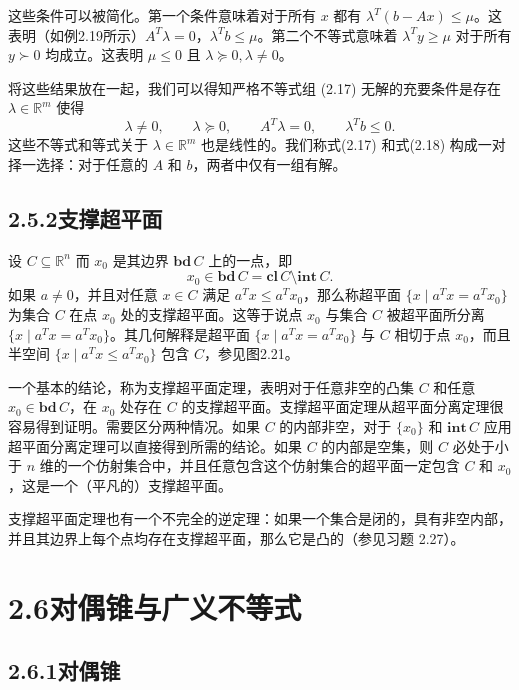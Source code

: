 \documentclass[UTF8,12pt,a4paper,fontset=fandol]{ctexart}
\begin{document}
这些条件可以被简化。第一个条件意味着对于所有 $x$ 都有 $\lambda^T(b-Ax)\le\mu$。这表明（如例2.19所示）$A^T\lambda=0$，$\lambda^Tb\le\mu$。第二个不等式意味着 $\lambda^Ty\ge\mu$ 对于所有 $y\succ0$ 均成立。这表明 $\mu\le0$ 且 $\lambda\succeq0,\lambda\ne0$。

将这些结果放在一起，我们可以得知严格不等式组 (2.17) 无解的充要条件是存在 $\lambda\in\mathbb{R}^m$ 使得
\begin{equation}
  \lambda\ne0,\qquad \lambda\succeq0,\qquad A^T\lambda=0,\qquad \lambda^Tb\le0.
  \tag{2.18}
\end{equation}
这些不等式和等式关于 $\lambda\in\mathbb{R}^m$ 也是线性的。我们称式(2.17) 和式(2.18) 构成一对择一选择：对于任意的 $A$ 和 $b$，两者中仅有一组有解。

\subsection*{2.5.2\quad 支撑超平面}

设 $C\subseteq\mathbb{R}^n$ 而 $x_0$ 是其边界 $\mathbf{bd}\,C$ 上的一点，即
\[
  x_0\in\mathbf{bd}\,C=\mathbf{cl}\,C\setminus\mathbf{int}\,C.
\]
如果 $a\ne0$，并且对任意 $x\in C$ 满足 $a^Tx\le a^Tx_0$，那么称超平面 $\{x\mid a^Tx=a^Tx_0\}$ 为集合 $C$ 在点 $x_0$ 处的支撑超平面。这等于说点 $x_0$ 与集合 $C$ 被超平面所分离 $\{x\mid a^Tx=a^Tx_0\}$。其几何解释是超平面 $\{x\mid a^Tx=a^Tx_0\}$ 与 $C$ 相切于点 $x_0$，而且半空间 $\{x\mid a^Tx\le a^Tx_0\}$ 包含 $C$，参见图2.21。

一个基本的结论，称为支撑超平面定理，表明对于任意非空的凸集 $C$ 和任意 $x_0\in\mathbf{bd}\,C$，在 $x_0$ 处存在 $C$ 的支撑超平面。支撑超平面定理从超平面分离定理很容易得到证明。需要区分两种情况。如果 $C$ 的内部非空，对于 $\{x_0\}$ 和 $\mathbf{int}\,C$ 应用超平面分离定理可以直接得到所需的结论。如果 $C$ 的内部是空集，则 $C$ 必处于小于 $n$ 维的一个仿射集合中，并且任意包含这个仿射集合的超平面一定包含 $C$ 和 $x_0$，这是一个（平凡的）支撑超平面。

支撑超平面定理也有一个不完全的逆定理：如果一个集合是闭的，具有非空内部，并且其边界上每个点均存在支撑超平面，那么它是凸的（参见习题 2.27）。

\section*{2.6\quad 对偶锥与广义不等式}

\subsection*{2.6.1\quad 对偶锥}
\end{document}
